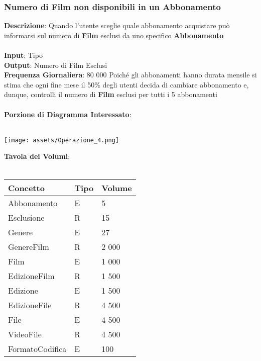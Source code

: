 \documentclass{article}
\begin{document}
\subsubsection{Numero di Film non disponibili in un Abbonamento}
\textbf{Descrizione}: Quando l'utente sceglie quale abbonamento acquistare può informarsi sul numero di \textbf{Film} esclusi da uno specifico \textbf{Abbonamento} \\ \\
\textbf{Input}: Tipo \\
\textbf{Output}: Numero di Film Esclusi \\
\textbf{Frequenza Giornaliera}: 80 000 Poiché gli abbonamenti hanno durata mensile si stima che ogni fine mese il 50\% degli utenti decida di cambiare abbonamento e, dunque, controlli il numero di \textbf{Film} esclusi per tutti i 5 abbonamenti \\ \\
\textbf{Porzione di Diagramma Interessato}: \\ \\
%
%
%
%
%
%
%
%
\begin{center}
\centering 
\texttt{[image: assets/Operazione\_4.png]}
\end{center} \newpage
\textbf{Tavola dei Volumi}: \\ \\
\begin{tabular}{|C{2.6cm}|C{2.6cm}|C{2.6cm}|}
\hline
    \textbf{Concetto} & \textbf{Tipo} & \textbf{Volume} \\
\hline
 Abbonamento & E & 5 \\
\hline
 Esclusione & R & 15 \\
\hline
 Genere & E & 27 \\
\hline
 GenereFilm & R & 2 000 \\
\hline
 Film & E & 1 000 \\
\hline
 EdizioneFilm & R & 1 500 \\
\hline 
 Edizione & E & 1 500 \\
\hline 
 EdizioneFile & R & 4 500 \\ 
\hline
 File & E & 4 500 \\ 
\hline
 VideoFile & R & 4 500 \\ 
\hline 
 FormatoCodifica & E & 100 \\ 
\hline 
\end{tabular} \\ \\ \\
\end{document}
